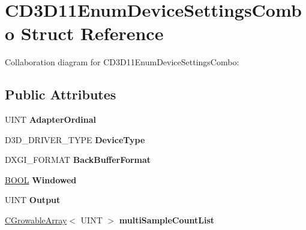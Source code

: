 \hypertarget{struct_c_d3_d11_enum_device_settings_combo}{\section{C\+D3\+D11\+Enum\+Device\+Settings\+Combo Struct Reference}
\label{struct_c_d3_d11_enum_device_settings_combo}
}


Collaboration diagram for C\+D3\+D11\+Enum\+Device\+Settings\+Combo\+:
\subsection*{Public Attributes}
\begin{DoxyCompactItemize}
\item 
\hypertarget{struct_c_d3_d11_enum_device_settings_combo_aa0370c5695cee54d93df1994b3a2012c}{U\+I\+N\+T {\bfseries Adapter\+Ordinal}}\label{struct_c_d3_d11_enum_device_settings_combo_aa0370c5695cee54d93df1994b3a2012c}

\item 
\hypertarget{struct_c_d3_d11_enum_device_settings_combo_ad78d28bf59a55b7ccde766f0fdf243e7}{D3\+D\+\_\+\+D\+R\+I\+V\+E\+R\+\_\+\+T\+Y\+P\+E {\bfseries Device\+Type}}\label{struct_c_d3_d11_enum_device_settings_combo_ad78d28bf59a55b7ccde766f0fdf243e7}

\item 
\hypertarget{struct_c_d3_d11_enum_device_settings_combo_a1d8259c33c786eec335946c9744e5371}{D\+X\+G\+I\+\_\+\+F\+O\+R\+M\+A\+T {\bfseries Back\+Buffer\+Format}}\label{struct_c_d3_d11_enum_device_settings_combo_a1d8259c33c786eec335946c9744e5371}

\item 
\hypertarget{struct_c_d3_d11_enum_device_settings_combo_a0f4e54d61fa25693372d2fb05854bf53}{\hyperlink{_ice_types_8h_a050c65e107f0c828f856a231f4b4e788}{B\+O\+O\+L} {\bfseries Windowed}}\label{struct_c_d3_d11_enum_device_settings_combo_a0f4e54d61fa25693372d2fb05854bf53}

\item 
\hypertarget{struct_c_d3_d11_enum_device_settings_combo_a1341df2324f659b72559156f75afb89c}{U\+I\+N\+T {\bfseries Output}}\label{struct_c_d3_d11_enum_device_settings_combo_a1341df2324f659b72559156f75afb89c}

\item 
\hypertarget{struct_c_d3_d11_enum_device_settings_combo_a9f91cc983f886ae5467391eb9ee10282}{\hyperlink{class_c_growable_array}{C\+Growable\+Array}$<$ U\+I\+N\+T $>$ {\bfseries multi\+Sample\+Count\+List}}\label{struct_c_d3_d11_enum_device_settings_combo_a9f91cc983f886ae5467391eb9ee10282}


\end{DoxyCompactItemize}
